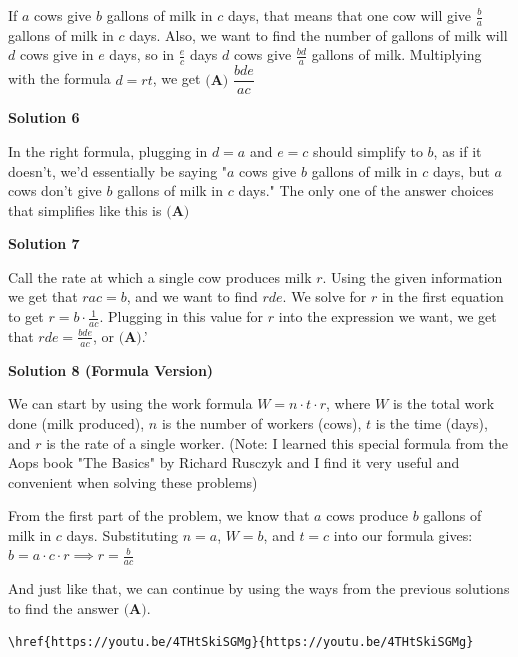 \begin{enumerate}
If $a$ cows give $b$ gallons of milk in $c$ days, that means that one cow will give $\frac{b}{a}$ gallons of milk in $c$ days. Also, we want to find the number of gallons of milk will $d$ cows give in $e$ days, so in $\frac{e}{c}$ days $d$ cows give $\frac{bd}{a}$ gallons of milk. Multiplying with the formula $d=rt$, we get $\boxed{\textbf{(A) } \dfrac{bde}{ac}}$




\textbf{Solution 6}

In the right formula, plugging in $d=a$ and $e=c$ should simplify to $b$, as if it doesn't, we'd essentially be saying "$a$ cows give $b$ gallons of milk in $c$ days, but $a$ cows don't give $b$ gallons of milk in $c$ days." The only one of the answer choices that simplifies like this is $\boxed{\textbf{(A)}}$




\textbf{Solution 7}

Call the rate at which a single cow produces milk $r$. Using the given information we get that $rac=b$, and we want to find $rde$. We solve for $r$ in the first equation to get $r=b \cdot \frac{1}{ac}$. Plugging in this value for $r$ into the expression we want, we get that $rde=\frac{bde}{ac}$, or $\boxed{\textbf{(A)}}$.'

 



\textbf{Solution 8 (Formula Version)}

We can start by using the work formula $W = n \cdot t \cdot r$, where $W$ is the total work done (milk produced), $n$ is the number of workers (cows), $t$ is the time (days), and $r$ is the rate of a single worker. (Note: I learned this special formula from the Aops book "The Basics" by Richard Rusczyk and I find it very useful and convenient when solving these problems)

 From the first part of the problem, we know that $a$ cows produce $b$ gallons of milk in $c$ days. Substituting $n = a$, $W = b$, and $t = c$ into our formula gives:$b = a \cdot c \cdot r \implies r = \frac{b}{ac}$

 And just like that, we can continue by using the ways from the previous solutions to find the answer $\boxed{\textbf{(A)}}$.

 \begin{verbatim}
\href{https://youtu.be/4THtSkiSGMg}{https://youtu.be/4THtSkiSGMg}
\end{verbatim}





\end{enumerate}
